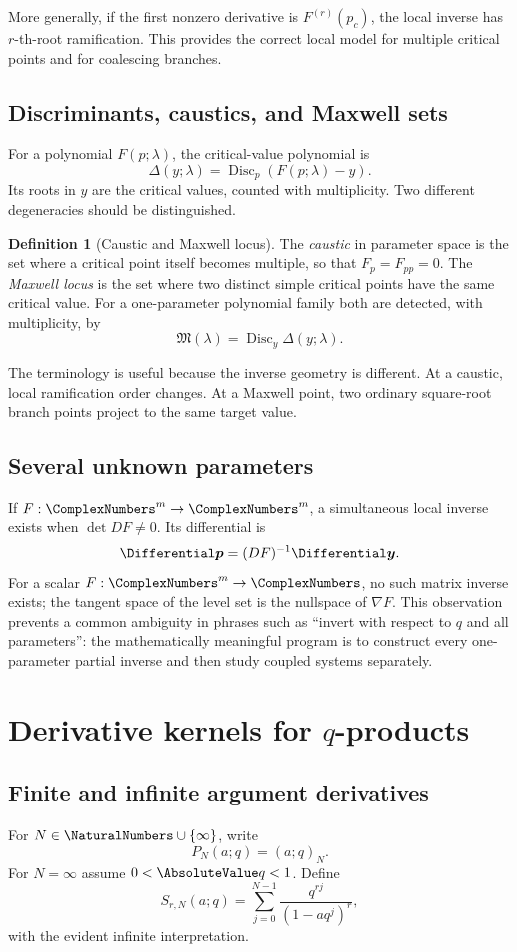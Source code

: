 \documentclass[11pt,oneside]{article}
\theoremstyle{definition}
\newtheorem{definition}[theorem]{Definition}
\theoremstyle{remark}
\theoremstyle{plain}
\theoremstyle{definition}
\theoremstyle{remark}
\newcommand{\Disc}{\operatorname{Disc}}
\numberwithin{equation}{section}
\numberwithin{figure}{section}
\numberwithin{table}{section}
\let\reporttopsection\section
\let\reportsubsection\subsection
\let\reportsubsubsection\subsubsection
\let\chapter\reporttopsection
\let\section\reportsubsection
\let\subsection\reportsubsubsection
\begin{document}
More generally, if the first nonzero derivative is \(F^{(r)}(p_c)\), the local
inverse has \(r\)-th-root ramification.  This provides the correct local model
for multiple critical points and for coalescing branches.

\section{Discriminants, caustics, and Maxwell sets}
For a polynomial \(F(p;\lambda)\), the critical-value polynomial is
\[
 \Delta(y;\lambda)=\Disc_p(F(p;\lambda)-y).
\]
Its roots in \(y\) are the critical values, counted with multiplicity.  Two
different degeneracies should be distinguished.
\begin{definition}[Caustic and Maxwell locus]
The \emph{caustic} in parameter space is the set where a critical point itself
becomes multiple, so that \(F_p=F_{pp}=0\).  The \emph{Maxwell locus} is the
set where two distinct simple critical points have the same critical value.
For a one-parameter polynomial family both are detected, with multiplicity, by
\[
 \mathfrak M(\lambda)=\Disc_y\Delta(y;\lambda).
\]
\end{definition}
The terminology is useful because the inverse geometry is different.  At a
caustic, local ramification order changes.  At a Maxwell point, two ordinary
square-root branch points project to the same target value.

\section{Several unknown parameters}
If \(F:\ComplexNumbers^m\to\ComplexNumbers^m\), a simultaneous local inverse exists when
\(\det DF\ne0\).  Its differential is
\[
 \Differential\bm p=(DF)^{-1}\Differential\bm y.
\]
For a scalar \(F:\ComplexNumbers^m\to\ComplexNumbers\), no such matrix inverse exists; the tangent space
of the level set is the nullspace of \(\nabla F\).  This observation prevents a
common ambiguity in phrases such as ``invert with respect to \(q\) and all
parameters'': the mathematically meaningful program is to construct every
one-parameter partial inverse and then study coupled systems separately.

\chapter{Derivative kernels for \texorpdfstring{\(q\)}{q}-products}

\section{Finite and infinite argument derivatives}
For \(N\in\NaturalNumbers\cup\{\infty\}\), write
\[
 P_N(a;q)=(a;q)_N.
\]
For \(N=\infty\) assume \(0<\AbsoluteValue q<1\).  Define
\[
 S_{r,N}(a;q)=\sum_{j=0}^{N-1}
 \frac{q^{rj}}{(1-aq^j)^r},
\]
with the evident infinite interpretation.
\end{document}
